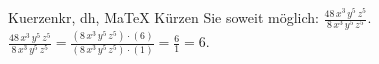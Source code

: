 \begin{MAufgabe}{Kuerzen}{kr, dh, MaTeX}
K\"urzen Sie soweit m\"oglich: $\frac{48\, x^3\, y^5\, z^5}{8\, x^3\, y^5\, z^5}$.\\ 
\ifLsg\MLoesung
\quad $\frac{48\, x^3\, y^5\, z^5}{8\, x^3\, y^5\, z^5}=\frac{(8\, x^3\, y^5\, z^5)\cdot(6)}{(8\, x^3\, y^5\, z^5)\cdot(1)}=\frac{6}{1}=6$.\else\relax\fi
 \end{MAufgabe}